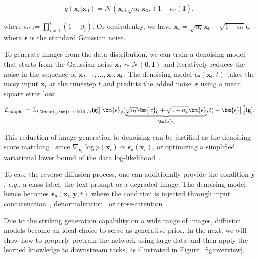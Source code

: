 \begin{equation}
    q\left(\bm{x}_{t} | \bm{x}_{0}\right) = \mathcal{N}\left(\bm{x}_{t} ; \sqrt{{\alpha}_{t}} \bm{x}_{0},\left(1-{\alpha}_{t}\right) \bm{I}\right),
\end{equation}

where $\alpha_{t}:=\prod_{i=1}^{t}\left(1-\beta_{i}\right)$. Or equivalently, we have $\bm{x}_{t}=\sqrt{{\alpha}_{t}} \bm{x}_{0}+\sqrt{1-{\alpha}_{t}} \bm{\epsilon}$, where $\bm{\epsilon}$ is the standard Gaussian noise.

To generate images from the data distribution, we can train a denoising model that starts from the Gaussian noise $\bm{x}_T \sim \mathcal{N}(\bm{0},\bm{I})$ and iteratively reduces the noise in the sequence of $\bm{x}_{T-1}, ..., \bm{x}_1, \bm{x}_0$. The denoising model $\bm{\epsilon}_{\theta}(\bm{x}_{t},t)$ takes the noisy input $\bm{x}_t$ at the timestep $t$ and predicts the added noise~$\bm{\epsilon}$ using a mean square error loss:

\begin{equation}
  \mathcal{L}_{\textnormal {simple }}=\mathbb{E}_{t, \bm{x}_0, \bm{\epsilon} \sim \mathcal{N}(0,I)} \mathbf{ig}[\big\|\bm{\epsilon}_{\theta}(\underbrace{\sqrt{\alpha_{t}} \bm{x}_0+\sqrt{1-\alpha_{t}}\bm{\epsilon}}_{\bm{x}_t} ,  t) - \bm{\epsilon}\big\|_2^2 \mathbf{ig}] .
\end{equation}

This reduction of image generation to denoising can be justified as the denoising score matching~\cite{song2020denoising} since $\nabla_{\bm{x}_{t}} \log p\left(\bm{x}_{t}\right) \propto \bm{\epsilon}_{\theta}(\bm{x}_t) $, or optimizing a simplified variational lower bound of the data log-likelihood~\cite{ho2020denoising}. 

To ease the reverse diffusion process, one can additionally provide the condition $\bm{y}$, \textit{e.g.}\@, a class label, the text prompt or a degraded image. The denoising model hence becomes $\bm{\epsilon}_{\theta}(\bm{x}_t, \bm{y}, t)$ where the condition is injected through input concatenation~\cite{saharia2021image}, denormalization~\cite{dhariwal2021diffusion} or cross-attention~\cite{nichol2021glide}. 

Due to the striking generation capability on a wide range of images, diffusion models become an ideal choice to serve as generative prior. In the next, we will show how to properly pretrain the network using large data and then apply the learned knowledge to downstream tasks, as illustrated in Figure~\ref{fig:overview}.

